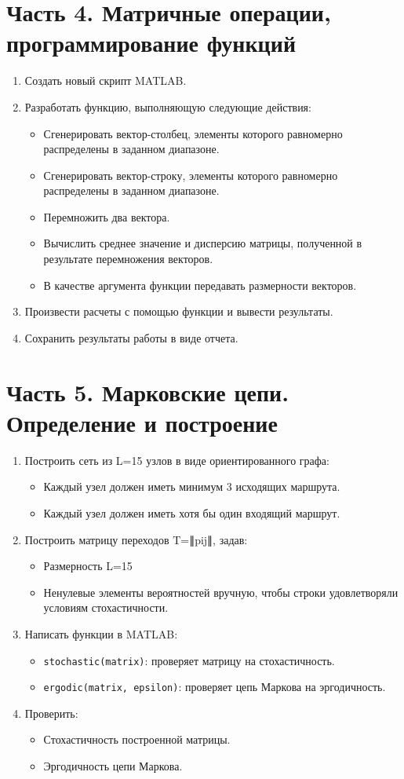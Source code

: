 \section*{Часть 4. Матричные операции, программирование функций}
\begin{enumerate}
\item Создать новый скрипт MATLAB.
\item Разработать функцию, выполняющую следующие действия:
\begin{itemize}
\item Сгенерировать вектор-столбец, элементы которого равномерно распределены в заданном диапазоне.
\item Сгенерировать вектор-строку, элементы которого равномерно распределены в заданном диапазоне.
\item Перемножить два вектора.
\item Вычислить среднее значение и дисперсию матрицы, полученной в результате перемножения векторов.
\item В качестве аргумента функции передавать размерности векторов.
\end{itemize}
\item Произвести расчеты с помощью функции и вывести результаты.
\item Сохранить результаты работы в виде отчета.
\end{enumerate}

\section*{Часть 5. Марковские цепи. Определение и построение}
\begin{enumerate}
\item Построить сеть из L=15 узлов в виде ориентированного графа:
\begin{itemize}
\item Каждый узел должен иметь минимум 3 исходящих маршрута.
\item Каждый узел должен иметь хотя бы один входящий маршрут.
\end{itemize}
\item Построить матрицу переходов T=∥pij∥, задав:
\begin{itemize}
\item Размерность L=15
\item Ненулевые элементы вероятностей вручную, чтобы строки удовлетворяли условиям стохастичности.
\end{itemize}
\item Написать функции в MATLAB:
\begin{itemize}
\item \texttt{stochastic(matrix)}: проверяет матрицу на стохастичность.
\item \texttt{ergodic(matrix, epsilon)}: проверяет цепь Маркова на эргодичность.
\end{itemize}
\item Проверить:
\begin{itemize}
\item Стохастичность построенной матрицы.
\item Эргодичность цепи Маркова.
\end{itemize}
\end{enumerate}


\endinput